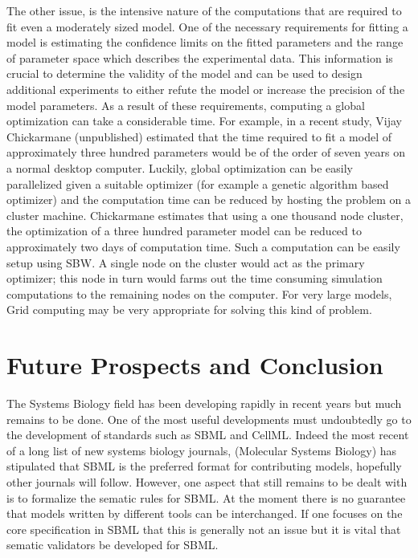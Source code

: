 \documentclass[12pt]{article}
\begin{document}
{The other issue, is the intensive nature of the computations that are required to fit even a moderately sized model. One of the necessary requirements for fitting a model is estimating the confidence limits on the fitted parameters and the range of parameter space which describes the experimental data. This information is crucial to determine
the validity of the model and can be used to design additional experiments to either refute the model or increase the precision of the model parameters. As a result of these requirements, computing a global optimization can take a considerable time. For example, in a recent study, Vijay Chickarmane (unpublished) estimated that the time required to fit a model of approximately three hundred parameters would be of the order of seven years on a normal desktop computer. Luckily, global optimization can be easily parallelized given a suitable optimizer (for example a genetic algorithm based optimizer) and the computation time can be reduced by hosting the problem on a cluster machine. Chickarmane estimates that using a one thousand node cluster, the optimization of a three hundred parameter model can be reduced to approximately two days of computation time. Such a computation can be easily setup using SBW. A single node on the cluster would act as the primary optimizer; this node in turn would farms out the time consuming simulation computations to the remaining nodes on the computer. For very large models, Grid computing \cite{GridComputing:Abbas} may be very appropriate for solving this kind of problem.

\section{Future Prospects and Conclusion}

The Systems Biology field has been developing rapidly in recent years but much remains to be done. One of the most useful developments must undoubtedly go to the development of standards such as SBML and CellML. Indeed the most recent of a long list of new systems biology journals, (Molecular Systems Biology) has stipulated that SBML is the preferred format for contributing models, hopefully other journals will follow. However, one aspect that still remains to be dealt with is to formalize the sematic rules for SBML. At the moment there is no guarantee that models written by different tools can be interchanged. If one focuses on the core specification in SBML that this is generally not an issue but it is vital that sematic validators be developed for SBML.

}
\end{document}

